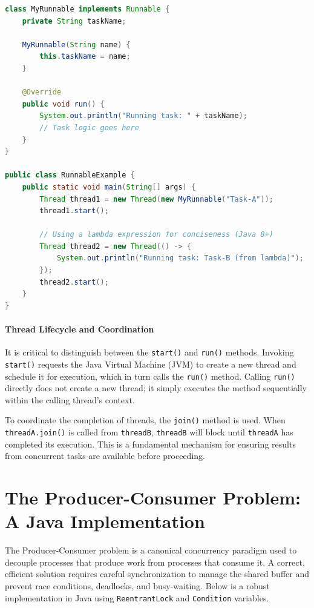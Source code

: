 \begin{lstlisting}[language=Java, caption={Creating a thread by implementing the Runnable interface}]
class MyRunnable implements Runnable {
    private String taskName;

    MyRunnable(String name) {
        this.taskName = name;
    }

    @Override
    public void run() {
        System.out.println("Running task: " + taskName);
        // Task logic goes here
    }
}

public class RunnableExample {
    public static void main(String[] args) {
        Thread thread1 = new Thread(new MyRunnable("Task-A"));
        thread1.start();

        // Using a lambda expression for conciseness (Java 8+)
        Thread thread2 = new Thread(() -> {
            System.out.println("Running task: Task-B (from lambda)");
        });
        thread2.start();
    }
}
\end{lstlisting}

\paragraph{Thread Lifecycle and Coordination}
It is critical to distinguish between the \texttt{start()} and \texttt{run()} methods. Invoking \texttt{start()} requests the Java Virtual Machine (JVM) to create a new thread and schedule it for execution, which in turn calls the \texttt{run()} method. Calling \texttt{run()} directly does not create a new thread; it simply executes the method sequentially within the calling thread's context.

To coordinate the completion of threads, the \texttt{join()} method is used. When \texttt{threadA.join()} is called from \texttt{threadB}, \texttt{threadB} will block until \texttt{threadA} has completed its execution. This is a fundamental mechanism for ensuring results from concurrent tasks are available before proceeding.

\section{The Producer-Consumer Problem: A Java Implementation}
The Producer-Consumer problem is a canonical concurrency paradigm used to decouple processes that produce work from processes that consume it. A correct, efficient solution requires careful synchronization to manage the shared buffer and prevent race conditions, deadlocks, and busy-waiting. Below is a robust implementation in Java using \texttt{ReentrantLock} and \texttt{Condition} variables.

